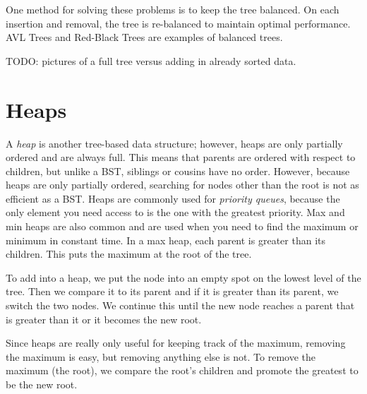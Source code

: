 One method for solving these problems is to keep the tree balanced.
On each insertion and removal, the tree is re-balanced to maintain optimal performance.
AVL Trees and Red-Black Trees are examples of balanced trees.

TODO: pictures of a full tree versus adding in already sorted data.

\section*{Heaps}

A \emph{heap} is another tree-based data structure; however, heaps are only partially ordered and are always full.
This means that parents are ordered with respect to children, but unlike a BST, siblings or cousins have no order.
However, because heaps are only partially ordered, searching for nodes other than the root is not as efficient as a BST.
Heaps are commonly used for \emph{priority queues}, because the only element you need access to is the one with the greatest priority.
Max and min heaps are also common and are used when you need to find the maximum or minimum in constant time.
In a max heap, each parent is greater than its children.
This puts the maximum at the root of the tree.


To add into a heap, we put the node into an empty spot on the lowest level of the tree.
Then we compare it to its parent and if it is greater than its parent, we switch the two nodes.
We continue this until the new node reaches a parent that is greater than it or it becomes the new root.

Since heaps are really only useful for keeping track of the maximum, removing the maximum is easy, but removing anything else is not.
To remove the maximum (the root), we compare the root's children and promote the greatest to be the new root.

